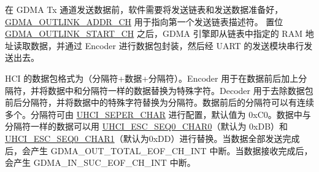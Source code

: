 \documentclass[main\_\_CN.tex]{subfiles}
\begin{document}
在 GDMA Tx 通道发送数据前，软件需要将发送链表和发送数据准备好，\hyperref[fielddesc:GDMAOUTLINKADDRCHN]{GDMA\_OUTLINK\_ADDR\_CH} 用于指向第一个发送链表描述符。 置位 \hyperref[fielddesc:GDMAOUTLINKSTARTCHN]{GDMA\_OUTLINK\_START\_CH} 之后，GDMA 引擎即从链表中指定的 RAM 地址读取数据，并通过 Encoder 进行数据包封装，然后经 UART 的发送模块串行发送出去。

HCI 的数据包格式为（分隔符+数据+分隔符）。Encoder 用于在数据前后加上分隔符，并将数据中和分隔符一样的数据替换为特殊字符。Decoder 用于去除数据包前后分隔符，并将数据中的特殊字符替换为分隔符。数据前后的分隔符可以有连续多个。分隔符可由 \hyperref[fielddesc:UHCISEPERCHAR]{UHCI\_SEPER\_CHAR} 进行配置，默认值为 0xC0。数据中与分隔符一样的数据可以用 \hyperref[fielddesc:UHCIESCSEQ0CHAR0]{UHCI\_ESC\_SEQ0\_CHAR0}（默认为 0xDB）和 \hyperref[fielddesc:UHCIESCSEQ0CHAR1]{UHCI\_ESC\_SEQ0\_CHAR1}（默认为0xDD）进行替换。当数据全部发送完成后，会产生 GDMA\_OUT\_TOTAL\_EOF\_CH\_INT 中断。当数据接收完成后，会产生 GDMA\_IN\_SUC\_EOF\_CH\_INT 中断。
\end{document}
